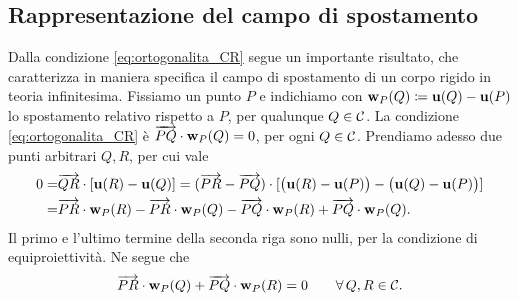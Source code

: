 \subsection{Rappresentazione del campo di spostamento}\label{sez:rappresentazione_campo}

Dalla condizione \eqref{eq:ortogonalita_CR} segue un importante risultato, che caratterizza in maniera specifica il campo di spostamento di un corpo rigido in teoria infinitesima.
Fissiamo un punto $P$ e indichiamo con $\mathbf{w}_P(Q)\coloneqq \mathbf{u}(Q)-\mathbf{u}(P)$ lo  spostamento relativo  rispetto a $P$, per qualunque $Q\in\mathcal{C}$. La condizione \eqref{eq:ortogonalita_CR}  è $\overrightarrow{PQ}\cdot \mathbf{w}_P(Q)=0$, per ogni $Q\in \mathcal{C}$. Prendiamo adesso due punti arbitrari $Q,R$, per cui vale
\begin{equation}
	\begin{aligned}
		0=&\overrightarrow{QR}\cdot[\mathbf{u}(R)-\mathbf{u}(Q)]=(\overrightarrow{PR}-\overrightarrow{PQ})\cdot [\big(\mathbf{u}(R)-\mathbf{u}(P)\big)-\big( \mathbf{u}(Q)-\mathbf{u}(P) \big)]\\
		=&\overrightarrow{PR}\cdot \mathbf{w}_P(R)-\overrightarrow{PR}\cdot \mathbf{w}_P(Q)-\overrightarrow{PQ}\cdot\mathbf{w}_P(R)+\overrightarrow{PQ}\cdot \mathbf{w}_P(Q).
	\end{aligned}
\end{equation}
Il primo e l'ultimo termine della seconda riga sono nulli, per la condizione di equiproiettività. Ne segue che
\begin{equation}\label{eq:bilineare_wP}
	\overrightarrow{PR}\cdot \mathbf{w}_P(Q)+\overrightarrow{PQ}\cdot\mathbf{w}_P(R)=0 \qquad \forall\, Q,R\in\mathcal{C}.
\end{equation}


